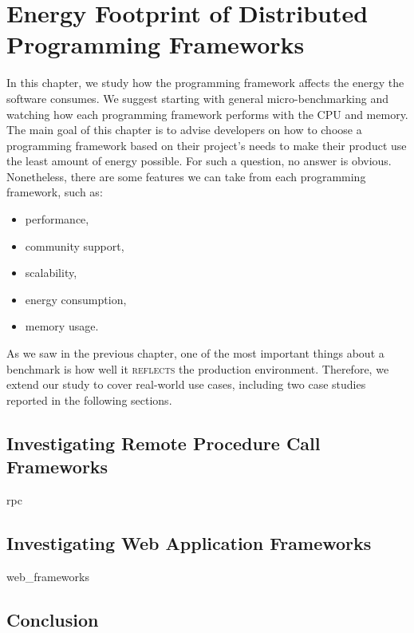 \chapter{Energy Footprint of Distributed Programming Frameworks}
\label{chapter:porgramming_langauges}
In this chapter, we study how the programming framework affects the energy the software consumes.
We suggest starting with general micro-benchmarking and watching how each programming framework performs with the CPU and memory.
The main goal of this chapter is to advise developers on how to choose a programming framework based on their project's needs to make their product use the least amount of energy possible.
For such a question, no answer is obvious.
Nonetheless, there are some features we can take from each programming framework, such as:
\begin{itemize}
    \item performance,
    \item community support,
    \item scalability,
    \item energy consumption,
    \item memory usage.
\end{itemize}

As we saw in the previous chapter, one of the most important things about a benchmark is how well it \textsc{reflects} the production environment.
Therefore, we extend our study to cover real-world use cases, including two case studies reported in the following sections.

\section{Investigating Remote Procedure Call Frameworks}
{rpc}


\section{Investigating Web Application Frameworks}
{web_frameworks}

\section{Conclusion }
